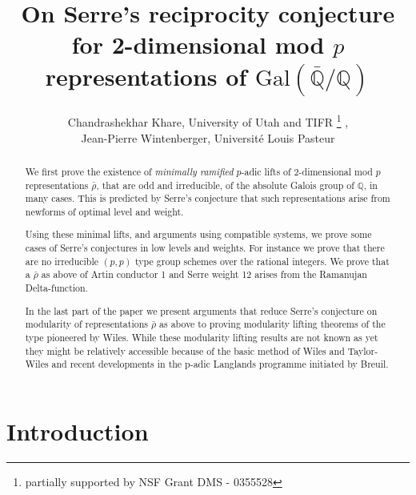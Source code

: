 \documentclass[12pt]{article}
\newcommand{\Q}{\mathbb{Q}}
\newcommand{\rhobar}{\overline{\rho}}
\def\rhobar{ {\bar {\rho} } }
\newcommand{\Galois}{\mathrm{Gal}}
\newcommand{\Gal}{\Galois( \bar{ {\mathbb Q}}/{\mathbb Q})}
\begin{document}
\title{On Serre's reciprocity conjecture for 2-dimensional mod $p$
 representations of $\Gal$ \\ }

\author{Chandrashekhar Khare, University of Utah and
TIFR \thanks{partially supported
by NSF Grant DMS - 0355528} , \\
Jean-Pierre Wintenberger, Universit\'e Louis Pasteur
}



\maketitle

\begin{abstract}
We first prove  the existence of {\it minimally
  ramified}  $p$-adic lifts of 
2-dimensional mod $p$  representations $\rhobar$, that are odd and
irreducible, of the absolute Galois group of $\Q$,  in many cases. This is
predicted by Serre's conjecture that such representations arise from
newforms of optimal level and weight.

Using these minimal lifts, and arguments using compatible systems,
we  prove some cases of Serre's conjectures in low levels and
weights. For instance we prove that there are no irreducible $(p,p)$ type
group schemes over the rational integers. We prove that a $\rhobar$ as above
of Artin conductor 1 and Serre weight 12 arises from the Ramanujan Delta-function.

In the last part of the paper we present arguments that reduce Serre's
conjecture on
modularity of representations $\rhobar$ as above to proving modularity
lifting theorems of the type pioneered
by Wiles. While these modularity lifting results are not known as yet they
might be relatively accessible because of the basic method of Wiles and
Taylor-Wiles and recent developments in the p-adic Langlands programme
initiated by Breuil.

\end{abstract}

\tableofcontents


\newcommand{\vep}{{\varepsilon}}

\section{Introduction}
\end{document}
